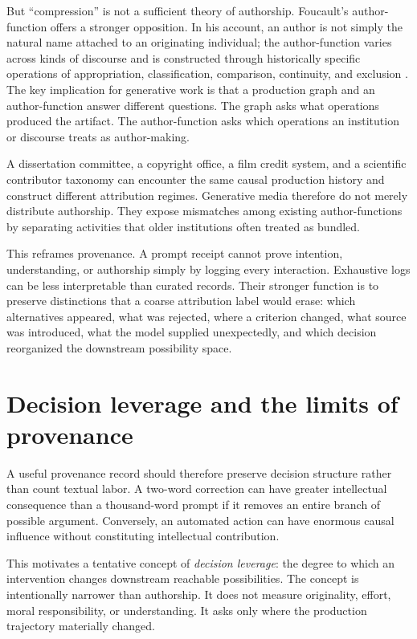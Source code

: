 \documentclass[11pt]{article}
\begin{document}
But ``compression'' is not a sufficient theory of authorship. Foucault's author-function offers a stronger opposition. In his account, an author is not simply the natural name attached to an originating individual; the author-function varies across kinds of discourse and is constructed through historically specific operations of appropriation, classification, comparison, continuity, and exclusion \parencite{foucault1977author}. The key implication for generative work is that a production graph and an author-function answer different questions. The graph asks what operations produced the artifact. The author-function asks which operations an institution or discourse treats as author-making.

A dissertation committee, a copyright office, a film credit system, and a scientific contributor taxonomy can encounter the same causal production history and construct different attribution regimes. Generative media therefore do not merely distribute authorship. They expose mismatches among existing author-functions by separating activities that older institutions often treated as bundled.

This reframes provenance. A prompt receipt cannot prove intention, understanding, or authorship simply by logging every interaction. Exhaustive logs can be less interpretable than curated records. Their stronger function is to preserve distinctions that a coarse attribution label would erase: which alternatives appeared, what was rejected, where a criterion changed, what source was introduced, what the model supplied unexpectedly, and which decision reorganized the downstream possibility space.

\section{Decision leverage and the limits of provenance}

A useful provenance record should therefore preserve decision structure rather than count textual labor. A two-word correction can have greater intellectual consequence than a thousand-word prompt if it removes an entire branch of possible argument. Conversely, an automated action can have enormous causal influence without constituting intellectual contribution.

This motivates a tentative concept of \emph{decision leverage}: the degree to which an intervention changes downstream reachable possibilities. The concept is intentionally narrower than authorship. It does not measure originality, effort, moral responsibility, or understanding. It asks only where the production trajectory materially changed.
\end{document}
